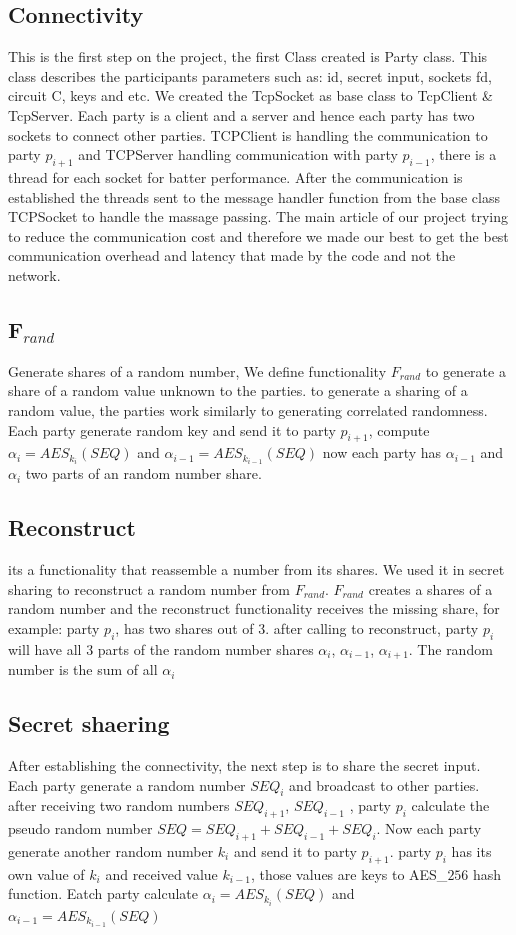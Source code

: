 \documentclass[12pt]{article}
\begin{document}
\subsection{Connectivity}
This is the first step on the project, the first Class created is Party class. This class describes the participants parameters such as: id, secret input, sockets fd, circuit C, keys and etc.
We created the TcpSocket as base class to TcpClient \& TcpServer. Each party is a client and a server and hence each party has two sockets to connect other parties. TCPClient is handling the communication to party $p_{i+1}$ and TCPServer handling communication with party $p_{i-1}$, there is a thread for  each socket for batter performance. After the communication is established the threads sent to the message handler function from the base class TCPSocket to handle the massage passing. The main article of our project trying to reduce the communication cost and therefore we made our best to get the best communication overhead and latency that made by the code and not the network.

\subsection{F$_{rand}$}
Generate shares of a random number, We define functionality
$F_{rand}$ to generate a share of a random value unknown to the
parties.
to generate a sharing of a random value, the parties work similarly
to generating correlated randomness. Each party generate random key and send it to party $p_{i+1}$, compute $\alpha_i = AES_{k_i}(SEQ)$ and $\alpha_{i-1} = AES_{k_{i-1}}(SEQ)$ now each party has $\alpha_{i-1}$ and $\alpha_i$ two parts of an random number share.

\subsection{Reconstruct}
its a functionality that reassemble a number from its shares. We used it in secret sharing to reconstruct a random number from $F_{rand}$.
$F_{rand}$ creates a shares of a random number and the reconstruct functionality receives the missing share, for example: party $p_{i}$, has two shares out of 3. after calling to reconstruct, party $p_{i}$ will have all 3 parts of the random number shares $\alpha_{i}$, $\alpha_{i-1}$, $\alpha_{i+1}$. The random number is the sum of all $\alpha_{i}$

\subsection{Secret shaering}
After establishing the connectivity, the next step is to share the secret input. Each party generate a random number $SEQ_i$ and broadcast to other parties. after receiving two random numbers $SEQ_{i+1}$, $SEQ_{i-1}$ , party $p_i$ calculate the pseudo random number $SEQ = SEQ_{i+1}+SEQ_{i-1}+SEQ_{i}$. Now each party generate another random number $k_i$ and send it to party $p_{i+1}$.
party $p_i$ has its own value of $k_i$ and received value $k_{i-1}$, those values are keys to AES\_$256$ hash function. Eatch party calculate $\alpha_i = AES_{k_i}(SEQ)$ and $\alpha_{i-1} = AES_{k_{i-1}}(SEQ)$
\end{document}
